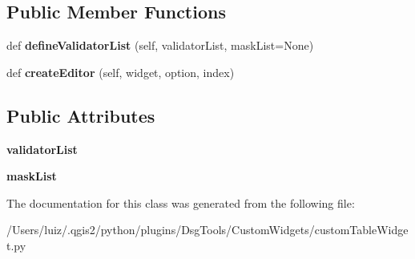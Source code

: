 \subsection*{Public Member Functions}
\begin{DoxyCompactItemize}
\item 
\mbox{\label{class_dsg_tools_1_1_custom_widgets_1_1custom_table_widget_1_1_validated_item_delegate_a68c0dd9ed455fe198e551014f0ba2dc5}} 
def {\bfseries define\+Validator\+List} (self, validator\+List, mask\+List=None)
\item 
\mbox{\label{class_dsg_tools_1_1_custom_widgets_1_1custom_table_widget_1_1_validated_item_delegate_ad12b7d12908bd32f8eac88bee1c678f1}} 
def {\bfseries create\+Editor} (self, widget, option, index)
\end{DoxyCompactItemize}
\subsection*{Public Attributes}
\begin{DoxyCompactItemize}
\item 
\mbox{\label{class_dsg_tools_1_1_custom_widgets_1_1custom_table_widget_1_1_validated_item_delegate_afa0387bf1a482632d065b6441b7dbd85}} 
{\bfseries validator\+List}
\item 
\mbox{\label{class_dsg_tools_1_1_custom_widgets_1_1custom_table_widget_1_1_validated_item_delegate_ae88e46cb5532f9c675e12b83dd4a58b0}} 
{\bfseries mask\+List}
\end{DoxyCompactItemize}


The documentation for this class was generated from the following file\+:\begin{DoxyCompactItemize}
\item 
/\+Users/luiz/.\+qgis2/python/plugins/\+Dsg\+Tools/\+Custom\+Widgets/custom\+Table\+Widget.\+py\end{DoxyCompactItemize}
